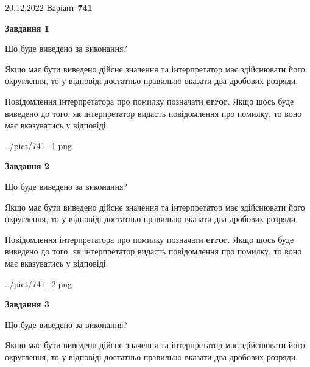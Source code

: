 \documentclass[12pt, ukrainian]{article}
\begin{document}
{20.12.2022 Варіант \No \textbf { 741 }\par}
{
\begin {Large}

{\begin {center}\textbf{Завдання 1}\end {center}}\par
Що буде виведено за виконання? \par

Якщо має бути виведено дійсне значення та інтерпретатор має здійснювати його округлення, 
то у відповіді достатньо правильно вказати два дробових розряди.

Повідомлення інтерпретатора про помилку позначати \textbf{error}.
Якщо щось буде виведено до того, як інтерпретатор видасть повідомлення про помилку, 
то воно має вказуватись у відповіді. \par

\begin{center}
	{../pict/741_1.png}
\end{center}
\newpage

{\begin {center}\textbf{Завдання 2}\end {center}}\par
Що буде виведено за виконання? \par

Якщо має бути виведено дійсне значення та інтерпретатор має здійснювати його округлення, 
то у відповіді достатньо правильно вказати два дробових розряди.

Повідомлення інтерпретатора про помилку позначати \textbf{error}.
Якщо щось буде виведено до того, як інтерпретатор видасть повідомлення про помилку, 
то воно має вказуватись у відповіді. \par

\begin{center}
	{../pict/741_2.png}
\end{center}
\newpage

{\begin {center}\textbf{Завдання 3}\end {center}}\par
Що буде виведено за виконання? \par

Якщо має бути виведено дійсне значення та інтерпретатор має здійснювати його округлення, 
то у відповіді достатньо правильно вказати два дробових розряди.


\end{Large}}
\end{document}

